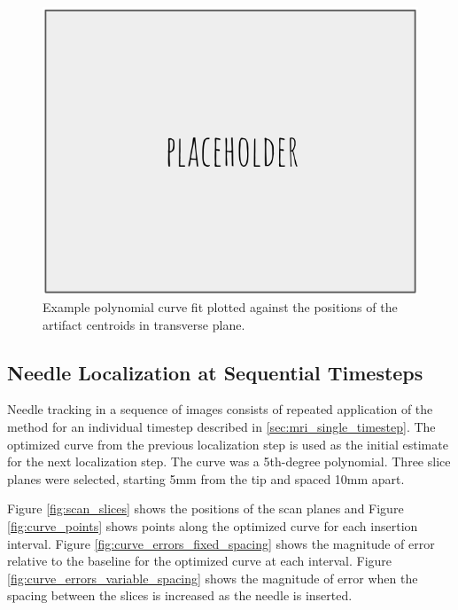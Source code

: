 \begin{figure}[h]
\includegraphics[width=1.0\textwidth]{Fig/placeholder.png}
\caption{Example polynomial curve fit plotted against the positions of the artifact centroids in transverse plane.}
\label{fig:curve_fit_artifact}
\end{figure}

\subsection{Needle Localization at Sequential Timesteps}
Needle tracking in a sequence of images consists of repeated application of the method for an individual timestep described in \ref{sec:mri_single_timestep}. The optimized curve from the previous localization step is used as the initial estimate for the next localization step. The curve was a 5th-degree polynomial. Three slice planes were selected, starting 5mm from the tip and spaced 10mm apart.

Figure \ref{fig:scan_slices} shows the positions of the scan planes and Figure \ref{fig:curve_points} shows points along the optimized curve for each insertion interval. Figure \ref{fig:curve_errors_fixed_spacing} shows the magnitude of error relative to the baseline for the optimized curve at each interval. Figure \ref{fig:curve_errors_variable_spacing} shows the magnitude of error when the spacing between the slices is increased as the needle is inserted.

